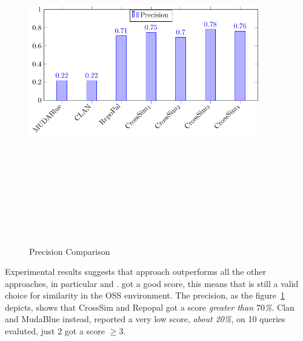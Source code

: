 
\begin{figure}[!h]
\includegraphics[width=10cm,height=15cm,keepaspectratio]{images/Precision.pdf}
\centering
\caption{Precision Comparison}
\label{fig:Precision}
\end{figure}


Experimental results suggests that \CrossSim approach outperforms all the other approaches, in particular \MUDABlue and \CLAN. \RepoPal got a good score, this means that is still a valid choice for similarity in the OSS environment. The precision, as the figure~\ref{fig:Precision} depicts, shows that CrossSim and Repopal got a score \emph{greater than $70$\%}. Clan and MudaBlue instead, reported a very low score, \emph{about 20\%}, on 10 queries evaluted, just 2 got a score \emph{$\geq3$}.

